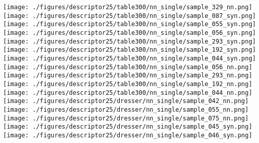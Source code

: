 \documentclass[10pt,twocolumn,letterpaper]{article}
\begin{document}
\begin{figure*}[h]
       \texttt{[image: ./figures/descriptor25/table300/nn\_single/sample\_329\_nn.png]}           
      \texttt{[image: ./figures/descriptor25/table300/nn\_single/sample\_087\_syn.png]}           \hspace{-1mm} 
     \texttt{[image: ./figures/descriptor25/table300/nn\_single/sample\_055\_syn.png]}           \hspace{-1mm} 
     \texttt{[image: ./figures/descriptor25/table300/nn\_single/sample\_056\_syn.png]}           \hspace{-1mm} 
      \texttt{[image: ./figures/descriptor25/table300/nn\_single/sample\_293\_syn.png]}           \hspace{-1mm} 
      \texttt{[image: ./figures/descriptor25/table300/nn\_single/sample\_192\_syn.png]}           \hspace{-1mm} 
     \texttt{[image: ./figures/descriptor25/table300/nn\_single/sample\_044\_syn.png]}                
      \texttt{[image: ./figures/descriptor25/table300/nn\_single/sample\_056\_nn.png]}           \hspace{-1mm} 
      \texttt{[image: ./figures/descriptor25/table300/nn\_single/sample\_293\_nn.png]}           \hspace{-1mm} 
     \texttt{[image: ./figures/descriptor25/table300/nn\_single/sample\_192\_nn.png]}           \hspace{-1mm} 
    \texttt{[image: ./figures/descriptor25/table300/nn\_single/sample\_044\_nn.png]}           \\
    \texttt{[image: ./figures/descriptor25/dresser/nn\_single/sample\_042\_nn.png]}          \hspace{-1mm}  
     \texttt{[image: ./figures/descriptor25/dresser/nn\_single/sample\_055\_nn.png]}          \hspace{-1mm}  
      \texttt{[image: ./figures/descriptor25/dresser/nn\_single/sample\_075\_nn.png]}         
    \texttt{[image: ./figures/descriptor25/dresser/nn\_single/sample\_045\_syn.png]}          \hspace{-1mm} 
     \texttt{[image: ./figures/descriptor25/dresser/nn\_single/sample\_046\_syn.png]}          \hspace{-1mm} 

\end{figure*}
\end{document}
